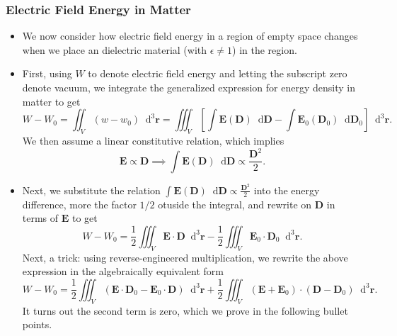 \documentclass[11pt, a4paper]{article}
\newcommand{\diff}{\mathop{}\!\mathrm{d}} %
\newcommand{\dr}{\diff^{3} \r}  %
\renewcommand{\vec}[1]{\bm{#1}} %
\renewcommand{\r}{\vec{r}}
\newcommand{\E}{\vec{E}} %
\newcommand{\D}{\vec{D}}  %
\begin{document}
\subsubsection{Electric Field Energy in Matter}
\begin{itemize}
    \item We now consider how electric field energy in a region of empty space changes when we place an dielectric material (with $ \epsilon \neq 1 $) in the region.
	
	\item First, using $ W $ to denote electric field energy and letting the subscript zero denote vacuum, we integrate the generalized expression for energy density in matter to get
	\begin{equation*}
        W - W_{0} = \iint_{V}(w - w_{0})\dr = \iiint_{V} \left[\int \E(\D) \diff \D - \int \E_{0}(\D_{0}) \diff \D_{0} \right] \dr.
	\end{equation*}
	We then assume a linear constitutive relation, which implies
	\begin{equation*}
		\E \propto \D \implies \int \E(\D) \diff \D \propto \frac{\D^{2}}{2}.
	\end{equation*}

    \item Next, we substitute the relation $ \int \E(\D) \diff \D \propto \frac{\D^{2}}{2} $ into the energy difference, more the factor $ 1/2 $ otuside the integral, and rewrite on $ \D $ in terms of $ \E $ to get
	\begin{equation*}
		W - W_{0} = \frac{1}{2}\iiint_{V} \E \cdot \D \dr - \frac{1}{2}\iiint_{V}\E_{0}\cdot \D_{0}\dr.
	\end{equation*}
	Next, a trick: using reverse-engineered multiplication, we rewrite the above expression in the algebraically equivalent form
	\begin{equation*}
		W - W_{0} = \frac{1}{2}\iiint_{V}(\E \cdot \D_{0} - \E_{0}\cdot\D)\dr + \frac{1}{2}\iiint_{V}(\E + \E_{0})\cdot (\D - \D_{0})\dr.
	\end{equation*}
    It turns out the second term is zero, which we prove in the following bullet points.


\end{itemize}
\end{document}
